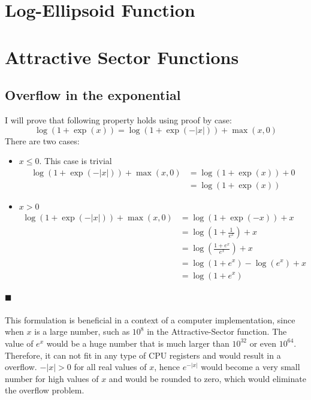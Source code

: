 \documentclass[a4paper]{article}
\newcommand*{\QEDA}{\hfill\ensuremath{\blacksquare}}%
\begin{document}
\section{Log-Ellipsoid Function}
\label{sec:log-ellipsoid}

\section{Attractive Sector Functions}
\label{sec:attractive}

\subsection{Overflow in the exponential}
I will prove that following property holds using proof by case:
\[
\log (1+\exp (x))=\log (1+\exp (-|x|))+\max (x, 0)
\]
There are two cases:
\begin{itemize}
\item $x \leq 0$. This case is trivial
  \begin{align*}
    \log (1+\exp (-|x|))+\max (x, 0) &= \log (1+\exp (x)) + 0\\
    &= \log (1+\exp(x))
  \end{align*}
\item $x > 0$
  \begin{align*}
    \log (1+\exp (-|x|))+\max (x, 0) &= \log (1+\exp (-x)) + x\\
    &=\log \left(1 + \frac{1}{e^{x}}\right) + x\\
    &=\log \left(\frac{1 + e^{x}}{e^{x}}\right) + x\\
    &=\log (1 + e^{x}) - \log \left(e^{x}\right) + x\\
    &=\log (1 + e^{x})
  \end{align*}
\end{itemize}
\QEDA\\\\
This formulation is beneficial in a context of a computer implementation, since
when $x$ is a large number, such as $10^8$ in the Attractive-Sector function.
The value of $e^{x}$ would be a huge number that is much larger than
$10^{32}$ or even $10^{64}$. Therefore, it can not fit in any type of CPU
registers and would result in a overflow. $-|x| > 0$ for all real values of $x$,
hence $e^{-|x|}$ would become a very small number for high values of $x$ and
would be rounded to zero, which would eliminate the overflow problem.


\end{document}
